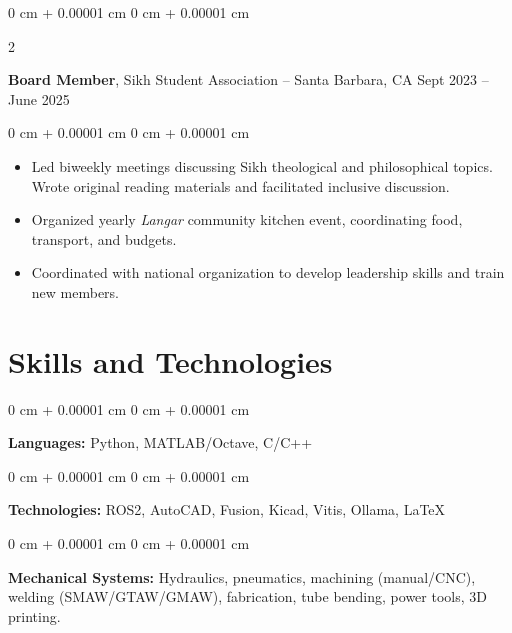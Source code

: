 \documentclass[10pt, letterpaper]{article}
\newenvironment{highlights}{
    \begin{itemize}[
        topsep=0.10 cm,
        parsep=0.10 cm,
        partopsep=0pt,
        itemsep=0pt,
        leftmargin=0 cm + 10pt
    ]
}{
    \end{itemize}
} %
\newenvironment{onecolentry}{
    \begin{adjustwidth}{
        0 cm + 0.00001 cm
    }{
        0 cm + 0.00001 cm
    }
}{
    \end{adjustwidth}
} %
\newenvironment{twocolentry}[2][]{
    \onecolentry
    \def\secondColumn{#2}
    \setcolumnwidth{\fill, 4.5 cm}
    \begin{paracol}{2}
}{
    \switchcolumn \raggedleft \secondColumn
    \end{paracol}
    \endonecolentry
} %
\begin{document}
        \vspace{0.2 cm}

        \begin{twocolentry}{
            Sept 2023 – June 2025
        }
            \textbf{Board Member}, Sikh Student Association -- Santa Barbara, CA \end{twocolentry}

        \vspace{0.10 cm}
        \begin{onecolentry}
            \begin{highlights}
                \item Led biweekly meetings discussing Sikh theological and philosophical topics. Wrote original reading materials and facilitated  inclusive discussion.
                \item Organized yearly \textit{Langar} community kitchen event, coordinating food, transport, and budgets.
                \item Coordinated with national organization to develop leadership skills and train new members.
            \end{highlights}
        \end{onecolentry}

    \section{Skills and Technologies}

        \begin{onecolentry}
            \textbf{Languages:} Python, MATLAB/Octave, C/C++
        \end{onecolentry}

        \vspace{0.1 cm}

        \begin{onecolentry}
            \textbf{Technologies:} ROS2, AutoCAD, Fusion, Kicad, Vitis, Ollama, \LaTeX
        \end{onecolentry}
        
        \vspace{0.1 cm}

        \begin{onecolentry}
            \textbf{Mechanical Systems:} Hydraulics, pneumatics, machining (manual/CNC), welding (SMAW/GTAW/GMAW), fabrication, tube bending, power tools, 3D printing. 
        \end{onecolentry}
\end{document}
